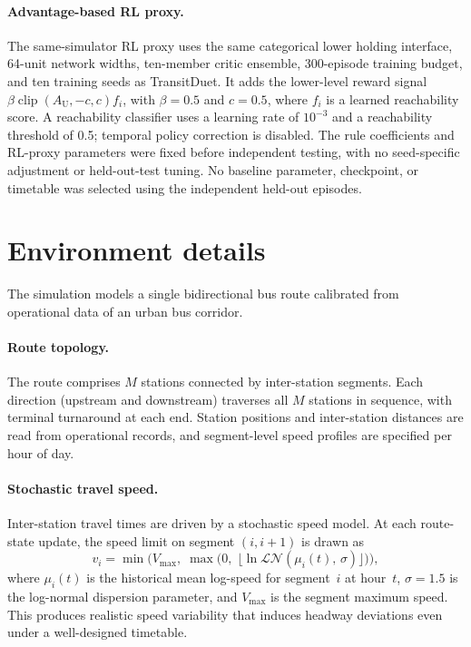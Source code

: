 \paragraph{Advantage-based RL proxy.}
The same-simulator RL proxy uses the same categorical lower holding interface, 64-unit network widths, ten-member critic ensemble, 300-episode training budget, and ten training seeds as TransitDuet.
It adds the lower-level reward signal $\beta\operatorname{clip}(A_{\mathrm U},-c,c)f_i$, with $\beta=0.5$ and $c=0.5$, where $f_i$ is a learned reachability score.
A reachability classifier uses a learning rate of $10^{-3}$ and a reachability threshold of 0.5; temporal policy correction is disabled.
The rule coefficients and RL-proxy parameters were fixed before independent testing, with no seed-specific adjustment or held-out-test tuning.
No baseline parameter, checkpoint, or timetable was selected using the independent held-out episodes.

\section{Environment details}
\label{app:env}

The simulation models a single bidirectional bus route calibrated from operational data of an urban bus corridor.

\paragraph{Route topology.}
The route comprises $M$ stations connected by inter-station segments.
Each direction (upstream and downstream) traverses all $M$ stations in sequence, with terminal turnaround at each end.
Station positions and inter-station distances are read from operational records, and segment-level speed profiles are specified per hour of day.

\paragraph{Stochastic travel speed.}
Inter-station travel times are driven by a stochastic speed model.
At each route-state update, the speed limit on segment $(i, i{+}1)$ is drawn as
\begin{equation}
  v_{i} = \min\!\bigl(V_{\max},\;\max\bigl(0,\;\lfloor\ln\mathcal{LN}(\mu_i(t),\,\sigma)\rfloor\bigr)\bigr),
\end{equation}
where $\mu_i(t)$ is the historical mean log-speed for segment~$i$ at hour~$t$, $\sigma = 1.5$ is the log-normal dispersion parameter, and $V_{\max}$ is the segment maximum speed.
This produces realistic speed variability that induces headway deviations even under a well-designed timetable.

